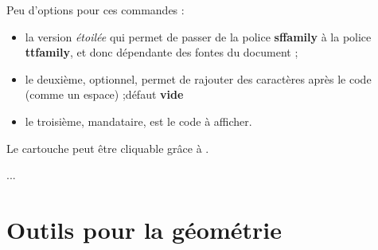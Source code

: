 \documentclass{article}
\newcommand\ctex[1]{\tcbox[vignettelatex]{#1}}
\newcommand\Cle[1]{{\bfseries\sffamily\textlangle #1\textrangle}}
\begin{document}
\begin{codecles}
Peu d'options pour ces commandes :

\begin{itemize}
	\item la version \textit{étoilée} qui permet de  passer de la police \Cle{sffamily} à la police \Cle{ttfamily}, et donc dépendante des fontes du document ;
	\item le deuxième, optionnel, permet de rajouter des caractères après le code (comme un \textsf{espace}) ;\hfill{}défaut \Cle{vide}
	\item le troisième, mandataire, est le \textsf{code} à afficher.
\end{itemize}
\end{codecles}

\begin{codetex}



\end{codetex}

\begin{codesortie}



\end{codesortie}

\begin{codeinfo}
Le \textsf{cartouche} peut être \og cliquable \fg{} grâce à \ctex{href}.
\end{codeinfo}

\begin{codetex}
\usepackage{hyperref}
...
\href{https://capytale2.ac-paris.fr/web/c/abcd-12345}{}
\end{codetex}

\begin{codesortie}
\href{https://capytale2.ac-paris.fr/web/c/abcd-12345}{}
\end{codesortie}

\newpage

\part{Outils pour la géométrie}
\end{document}
